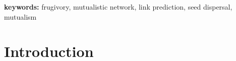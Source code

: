 \documentclass[num-refs]{article}%
\begin{document}
\textbf{keywords:} frugivory, mutualistic network, link prediction, seed dispersal, mutualism


\rsbreak
















\clearpage 

\section*{Introduction}
\paragraph*{}
\end{document}

